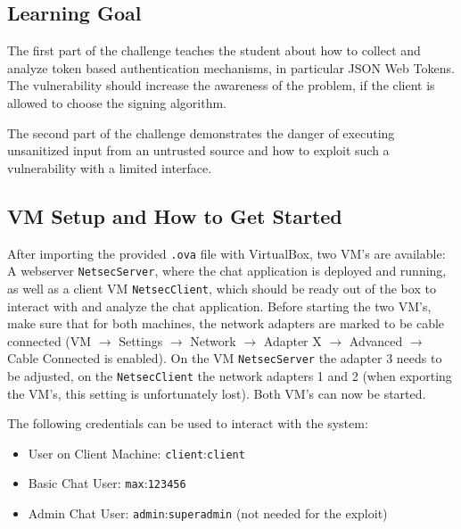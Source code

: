 \documentclass[12pt,a4paper]{article}
\newcommand{\code}[1]{\texttt{#1}}
\begin{document}
\subsection{Learning Goal}

The first part of the challenge teaches the student about how to collect and analyze token based authentication mechanisms, in particular JSON Web Tokens. The vulnerability should increase the awareness of the problem, if the client is allowed to choose the signing algorithm.

The second part of the challenge demonstrates the danger of executing unsanitized input from an untrusted source and how to exploit such a vulnerability with a limited interface.

\subsection{VM Setup and How to Get Started}
After importing the provided \code{.ova} file with VirtualBox, two VM's are available: A webserver \code{NetsecServer}, where the chat application is deployed and running, as well as a client VM \code{NetsecClient}, which should be ready out of the box to interact with and analyze the chat application. Before starting the two VM's, make sure that for both machines, the network adapters are marked to be cable connected (VM $\rightarrow$ Settings $\rightarrow$ Network $\rightarrow$ Adapter X $\rightarrow$ Advanced $\rightarrow$ Cable Connected is enabled). On the VM \code{NetsecServer} the adapter 3 needs to be adjusted, on the \code{NetsecClient} the network adapters 1 and 2 (when exporting the VM's, this setting is unfortunately lost). Both VM's can now be started.

The following credentials can be used to interact with the system:
\begin{itemize}
	\item User on Client Machine: \code{client}:\code{client}
	\item Basic Chat User: \code{max}:\code{123456}
	\item Admin Chat User: \code{admin}:\code{superadmin} (not needed for the exploit)
\end{itemize}
\end{document}
